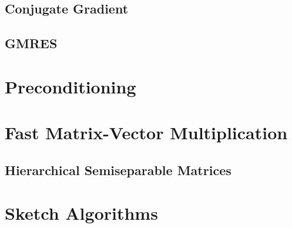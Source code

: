 \subsection{Conjugate Gradient}
\subsection{GMRES}

\section{Preconditioning}

\section{Fast Matrix-Vector Multiplication}
\subsection{Hierarchical Semiseparable Matrices}


\section{Sketch Algorithms}

